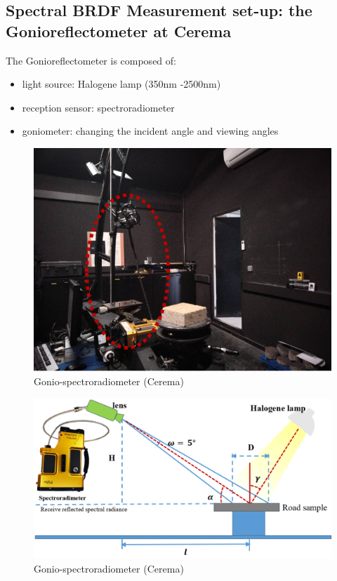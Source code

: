 \subsection{Spectral BRDF Measurement set-up: the Gonioreflectometer at Cerema}


The Gonioreflectometer is composed of:
\begin{itemize}
    \item light source: Halogene lamp (350nm -2500nm)
    \item reception sensor: spectroradiometer
    \item goniometer: changing the incident angle and viewing angles
\end{itemize}





\begin{figure}[!tb]
    \centering
    \includegraphics[width=0.9\linewidth]{./figures/spectral-brdf-measurements/gonio-spectroradiometer.png}
    \caption{Gonio-spectroradiometer (Cerema)}
    \label{fig:gonio-spectroradiometer}
\end{figure}

\begin{figure}[!tb]
    \centering
    \includegraphics[width=0.9\linewidth]{./figures/spectral-brdf-measurements/gonio-simple.png}
    \caption{Gonio-spectroradiometer (Cerema)}
    \label{fig:gonio-simple}
\end{figure}

